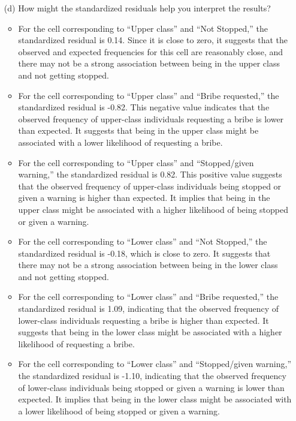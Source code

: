 \documentclass[12pt,letterpaper]{article}
\begin{document}
\begin{enumerate}
\begin{table}[h]
\begin{tabular}{l | c c c }
			\end{tabular}
		\end{table}
	
	\vspace{7cm}
	\newpage
	\item [(d)] How might the standardized residuals help you interpret the results?  
	\begin{itemize}
		\item For the cell corresponding to “Upper class” and “Not Stopped,” the standardized residual is 0.14. Since it is close to zero, it suggests that the observed and expected frequencies for this cell are reasonably close, and there may not be a strong association between being in the upper class and not getting stopped.
		\item For the cell corresponding to “Upper class” and “Bribe requested,” the standardized residual is -0.82. This negative value indicates that the observed frequency of upper-class individuals requesting a bribe is lower than expected. It suggests that being in the upper class might be associated with a lower likelihood of requesting a bribe.
		\item For the cell corresponding to “Upper class” and “Stopped/given warning,” the standardized residual is 0.82. This positive value suggests that the observed frequency of upper-class individuals being stopped or given a warning is higher than expected. It implies that being in the upper class might be associated with a higher likelihood of being stopped or given a warning.
		\item For the cell corresponding to “Lower class” and “Not Stopped,” the standardized residual is -0.18, which is close to zero. It suggests that there may not be a strong association between being in the lower class and not getting stopped.
		\item For the cell corresponding to “Lower class” and “Bribe requested,” the standardized residual is 1.09, indicating that the observed frequency of lower-class individuals requesting a bribe is higher than expected. It suggests that being in the lower class might be associated with a higher likelihood of requesting a bribe.
		\item For the cell corresponding to “Lower class” and “Stopped/given warning,” the standardized residual is -1.10, indicating that the observed frequency of lower-class individuals being stopped or given a warning is lower than expected. It implies that being in the lower class might be associated with a lower likelihood of being stopped or given a warning.
	\end{itemize}
\end{enumerate}
\newpage
\end{document}
